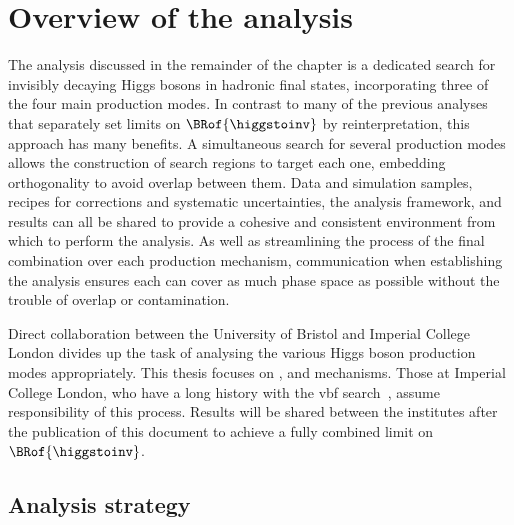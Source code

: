\section{Overview of the analysis}
\label{sec:htoinv_analysis_overview}

The analysis discussed in the remainder of the chapter is a dedicated search for invisibly decaying Higgs bosons in hadronic final states, incorporating three of the four main production modes. In contrast to many of the previous analyses that separately set limits on $\BRof{\higgstoinv}$ by reinterpretation, this approach has many benefits. A simultaneous search for several production modes allows the construction of search regions to target each one, embedding orthogonality to avoid overlap between them. Data and simulation samples, recipes for corrections and systematic uncertainties, the analysis framework, and results can all be shared to provide a cohesive and consistent environment from which to perform the analysis. As well as streamlining the process of the final combination over each production mechanism, communication when establishing the analysis ensures each can cover as much phase space as possible without the trouble of overlap or contamination.

Direct collaboration between the University of Bristol and Imperial College London divides up the task of analysing the various Higgs boson production modes appropriately. This thesis focuses on \ttH, \VH and \ggH mechanisms. Those at Imperial College London, who have a long history with the \acrshort{vbf} search~\cite{Chatrchyan:2014tja,Sirunyan:2018owy}, assume responsibility of this process. Results will be shared between the institutes after the publication of this document to achieve a fully combined limit on $\BRof{\higgstoinv}$.




\subsection{Analysis strategy}
\label{subsec:htoinv_analysis_strategy}

